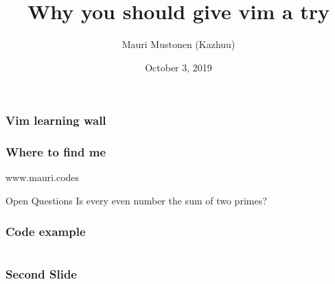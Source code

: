 \documentclass{beamer}
\title{Why you should give vim a try}
\author{Mauri Mustonen (Kazhuu)}
\date{October 3, 2019}
\begin{document}
\maketitle

\begin{frame}
    \frametitle{Vim learning wall}
\end{frame}

\usebackgroundtemplate{}
\begin{frame}
    \frametitle{Where to find me}
    www.mauri.codes
    \begin{block}{Open Questions}
        Is every even number the sum of two primes?
    \end{block}
\end{frame}

\begin{frame}[fragile]
    \frametitle{Code example}
    \inputminted{js}{codes/example.js}
\end{frame}

\begin{frame}
    \frametitle{Second Slide}
\end{frame}
\end{document}
